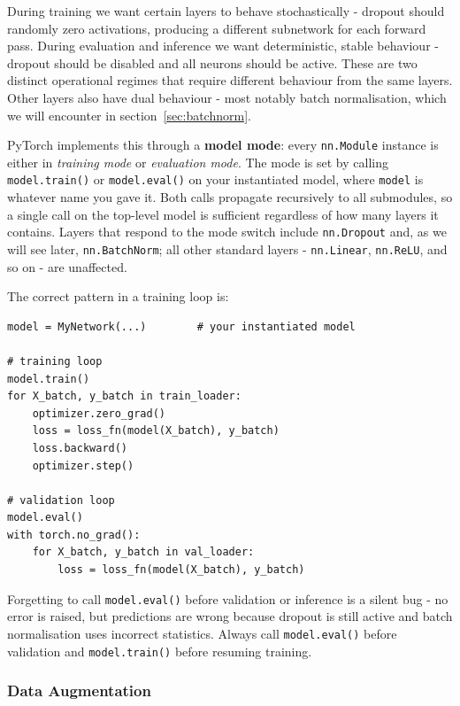 During training we want certain layers to behave stochastically - dropout should randomly zero activations, producing a different subnetwork for each forward pass. During evaluation and inference we want deterministic, stable behaviour - dropout should be disabled and all neurons should be active. These are two distinct operational regimes that require different behaviour from the same layers. Other layers also have dual behaviour - most notably batch normalisation, which we will encounter in section~\ref{sec:batchnorm}.

PyTorch implements this through a \textbf{model mode}: every \texttt{nn.Module} instance is either in \emph{training mode} or \emph{evaluation mode}. The mode is set by calling \texttt{model.train()} or \texttt{model.eval()} on your instantiated model, where \texttt{model} is whatever name you gave it. Both calls propagate recursively to all submodules, so a single call on the top-level model is sufficient regardless of how many layers it contains. Layers that respond to the mode switch include \texttt{nn.Dropout} and, as we will see later, \texttt{nn.BatchNorm}; all other standard layers - \texttt{nn.Linear}, \texttt{nn.ReLU}, and so on - are unaffected.

The correct pattern in a training loop is:

\begin{verbatim}
model = MyNetwork(...)        # your instantiated model

# training loop
model.train()
for X_batch, y_batch in train_loader:
    optimizer.zero_grad()
    loss = loss_fn(model(X_batch), y_batch)
    loss.backward()
    optimizer.step()

# validation loop
model.eval()
with torch.no_grad():
    for X_batch, y_batch in val_loader:
        loss = loss_fn(model(X_batch), y_batch)
\end{verbatim}

\begin{remark}
    Forgetting to call \texttt{model.eval()} before validation or inference is a silent bug - no error is raised, but predictions are wrong because dropout is still active and batch normalisation uses incorrect statistics. Always call \texttt{model.eval()} before validation and \texttt{model.train()} before resuming training.
\end{remark}

\subsubsection{Data Augmentation}


